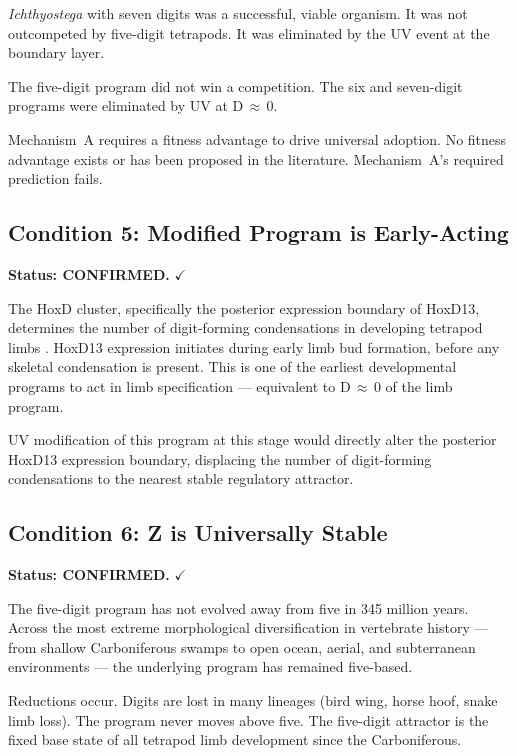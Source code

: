 \documentclass[11pt, a4paper]{article}
\begin{document}
\textit{Ichthyostega} with seven digits was a
successful, viable organism.
It was not outcompeted by five-digit tetrapods.
It was eliminated by the UV event at the
boundary layer.

The five-digit program did not win a competition.
The six and seven-digit programs were
eliminated by UV at D\,$\approx$\,0.

Mechanism~A requires a fitness advantage to drive
universal adoption.
No fitness advantage exists or has been proposed
in the literature.
Mechanism~A's required prediction fails.

\subsection{Condition 5: Modified Program is
Early-Acting}

\textbf{Status: CONFIRMED.} \textcolor{confirmgreen}{$\checkmark$}

The HoxD cluster, specifically the posterior
expression boundary of HoxD13, determines the
number of digit-forming condensations in developing
tetrapod limbs \cite{zakany2007}.
HoxD13 expression initiates during early limb
bud formation, before any skeletal condensation
is present.
This is one of the earliest developmental
programs to act in limb specification ---
equivalent to D\,$\approx$\,0 of the limb program.

UV modification of this program at this stage
would directly alter the posterior HoxD13
expression boundary, displacing the number of
digit-forming condensations to the nearest stable
regulatory attractor.

\subsection{Condition 6: Z is Universally Stable}

\textbf{Status: CONFIRMED.} \textcolor{confirmgreen}{$\checkmark$}

The five-digit program has not evolved away from
five in 345 million years.
Across the most extreme morphological diversification
in vertebrate history --- from shallow Carboniferous
swamps to open ocean, aerial, and subterranean
environments --- the underlying program has remained
five-based.

Reductions occur.
Digits are lost in many lineages (bird wing,
horse hoof, snake limb loss).
The program never moves above five.
The five-digit attractor is the fixed base state
of all tetrapod limb development since the
Carboniferous.
\end{document}
